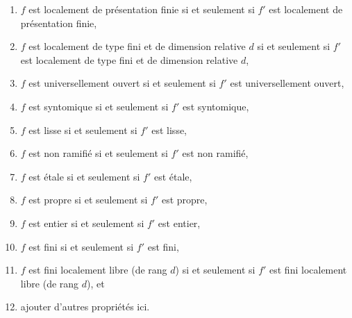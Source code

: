 \begin{lemma}
\begin{enumerate}
\item
\label{item-finite-presentation}
$f$ est localement de présentation finie si et seulement si $f'$ est localement de
présentation finie,
\item
\label{item-relative-dimension-d}
$f$ est localement de type fini et de dimension relative $d$ si et seulement si
$f'$ est localement de type fini et de dimension relative $d$,
\item $f$ est universellement ouvert si et seulement si $f'$ est universellement ouvert,
\label{item-universally-open}
\item $f$ est syntomique si et seulement si $f'$ est syntomique,
\label{item-syntomic}
\item $f$ est lisse si et seulement si $f'$ est lisse,
\label{item-smooth}
\item $f$ est non ramifié si et seulement si $f'$ est non ramifié,
\label{item-unramified}
\item $f$ est étale si et seulement si $f'$ est étale,
\label{item-etale}
\item $f$ est propre si et seulement si $f'$ est propre,
\label{item-proper}
\item $f$ est entier si et seulement si $f'$ est entier,
\label{item-integral}
\item $f$ est fini si et seulement si $f'$ est fini,
\label{item-finite}
\item
\label{item-finite-locally-free}
$f$ est fini localement libre (de rang $d$) si et seulement si $f'$
est fini localement libre (de rang $d$), et
\item ajouter d'autres propriétés ici.
\end{enumerate}
\end{lemma}

